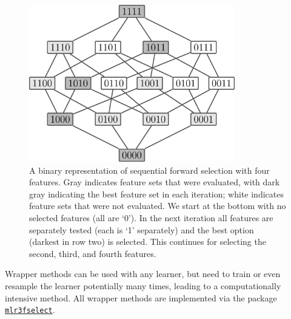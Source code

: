 \begin{figure}

{\centering \includegraphics[width=0.8\textwidth,height=\textheight]{chapters/chapter6/Figures/mlr3book_figures-16.png}

}

\caption{\label{fig-sequential-forward-selection}A binary representation
of sequential forward selection with four features. Gray indicates
feature sets that were evaluated, with dark gray indicating the best
feature set in each iteration; white indicates feature sets that were
not evaluated. We start at the bottom with no selected features (all are
`0'). In the next iteration all features are separately tested (each is
`1' separately) and the best option (darkest in row two) is selected.
This continues for selecting the second, third, and fourth features.}

\end{figure}

Wrapper methods can be used with any learner, but need to train or even
resample the learner potentially many times, leading to a
computationally intensive method. All wrapper methods are implemented
via the package
\href{https://mlr3fselect.mlr-org.com}{\texttt{mlr3fselect}}.

